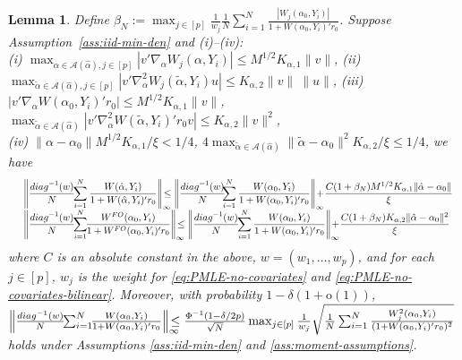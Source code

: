 \documentclass[11pt]{article}
\newtheorem{lemma}{Lemma}
\begin{document}
\begin{lemma}\label{lemma:Score:nocovariate}
Define $\displaystyle\beta_N := \max_{j\in[p]}\frac{1}{w_j}\frac{1}{N}\sum_{i=1}^N \frac{|W_j(\alpha_0,Y_i)|}{1+W(\alpha_0,Y_i)'r_0}$.
Suppose Assumption~\ref{ass:iid-min-den} and (i)--(iv):\\
(i) $\displaystyle\max_{\alpha \in\mathcal{A}(\hat{\alpha}), j\in[p]}|v'\nabla_\alpha W_j(\alpha,Y_i)| \leq M^{1/2}K_{\alpha,1}\|v\|$, (ii) $\max_{\tilde \alpha \in \mathcal{A}(\hat\alpha), j\in [p]} |v'\nabla_\alpha^2 W_j(\tilde\alpha,Y_i)u| \leq K_{\alpha,2}\|v\|\ \|u\| $, (iii) $\displaystyle|v'\nabla_\alpha W(\alpha_0,Y_i)'r_0| \leq M^{1/2}K_{\alpha,1}\|v\|$, $\max_{\tilde \alpha \in \mathcal{A}(\hat\alpha)} |v'\nabla_\alpha^2 W(\tilde\alpha,Y_i)'r_0v| \leq K_{\alpha,2}\|v\|^2$, \\
(iv) $\displaystyle\|\alpha-\alpha_0\|M^{1/2}K_{\alpha,1}/\xi < 1/4$,  $4\max_{\tilde\alpha \in \mathcal{A}(\hat\alpha)}\|\tilde \alpha-\alpha_0\|^2 K_{\alpha,2}/\xi \leq 1/4$, we have 
$$\begin{array}{rl}
&\displaystyle\left\|\frac{{\rm diag}^{-1}(w)}{N}\!\!\sum_{i=1}^N \frac{W(\hat\alpha,Y_i)}{1+W(\hat\alpha,Y_i)'r_0}\right\|_\infty\!\!\!\!\!\!\leq \left\|\frac{{\rm diag}^{-1}(w)}{N}\!\!\!\sum_{i=1}^N\frac{W(\alpha_0,Y_i)}{1+W(\alpha_0,Y_i)'r_0}\right\|_\infty\!\!\!\!\!\!+\!\frac{C(1+\beta_N)M^{1/2}K_{\alpha,1}\|\hat\alpha-\alpha_0\|}{\xi} \\
&\displaystyle\left\|\frac{{\rm diag}^{-1}(w)}{N}\!\!\sum_{i=1}^N\!\!\frac{W^{FO}(\alpha_0,Y_i)}{1+W^{FO}(\alpha_0,Y_i)'r_0}\right\|_\infty\!\!\!\!\!\!\leq \left\|\frac{{\rm diag}^{-1}(w)}{N}\!\!\sum_{i=1}^N \frac{W(\alpha_0,Y_i)}{1+W(\alpha_0,Y_i)'r_0}\right\|_\infty\!\!\!\!\!\!+\!\frac{C (1+\beta_N)K_{\alpha,2}\|\hat\alpha-\alpha_0\|^2}{\xi}
\end{array}$$
where $C$ is an absolute constant in the above, $w=(w_1,\ldots,w_p)$, and for each $j\in[p]$, $w_j$ is the weight for \eqref{eq:PMLE-no-covariates} and \eqref{eq:PMLE-no-covariates-bilinear}. Moreover, with probability $1-\delta(1+\mathrm{o}(1))$,  $\left\|\frac{{\rm diag}^{-1}(w)}{N}\!\!\sum_{i=1}^N \!\!\frac{W(\alpha_0,Y_i)}{1+W(\alpha_0,Y_i)'r_0}\right\|_\infty\!\!\!\!\!\!\leq\frac{\Phi^{-1}(1-\delta/2p)}{\sqrt{N}}\max_{j\in[p]}\frac{1}{w_j}\sqrt{\frac{1}{N}\sum_{i=1}^N \frac{W_j^2(\alpha_0,Y_i)}{(1+W(\alpha_0,Y_i)'r_0)^2}}$ holds under Assumptions \ref{ass:iid-min-den} and \ref{ass:moment-assumptions}.
\end{lemma}
\end{document}
